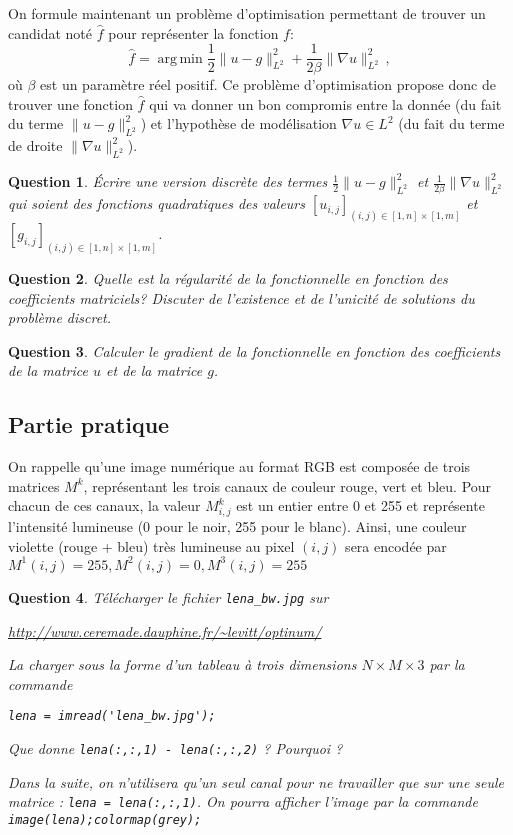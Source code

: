 \documentclass[10pt,a4paper,fleqn]{report}
\DeclareMathOperator*{\argmin}{arg\,min}
\newtheorem{question}{Question}
\begin{document}
 On formule maintenant un probl\`eme d'optimisation permettant de trouver un candidat not\'e $\hat{f}$ pour repr\'esenter la fonction $f$:
\begin{equation}
\hat{f} = \argmin \frac12 \| u -  g\|_{L^2}^2 + \frac{1}{2\beta}\| \nabla u \|^2_{L^2}\,,
\end{equation}
o\`u $\beta$ est un param\`etre r\'eel positif.
Ce probl\`eme d'optimisation propose donc de trouver une fonction $\hat{f}$ qui va donner un bon compromis entre la donn\'ee (du fait du terme $ \| u -  g\|_{L^2}^2 $) et l'hypoth\`ese de mod\'elisation $\nabla u \in L^2$ (du fait du terme de droite $\| \nabla u \|^2_{L^2}$).

\begin{question}
\'Ecrire une version discr\`ete des termes $\frac12 \| u -  g\|_{L^2}^2$ et $\frac{1}{2\beta}\| \nabla u \|^2_{L^2}$ qui soient des fonctions quadratiques des valeurs $[u_{i,j}]_{(i,j)\in [1,n]\times[1,m]}$ et $[g_{i,j}]_{(i,j)\in [1,n]\times[1,m]}$.
\end{question}

\begin{question}
Quelle est la r\'egularit\'e de la fonctionnelle en fonction des coefficients matriciels?
Discuter de l'existence et de l'unicit\'e de solutions du probl\`eme discret.
\end{question}

\begin{question}
Calculer le gradient de la fonctionnelle en fonction des coefficients de la matrice $u$ et de la matrice $g$.
\end{question}

\subsection{Partie pratique}

On rappelle qu'une image numérique au format RGB est composée de trois
matrices $M^{k}$, représentant les trois canaux de couleur rouge, vert
et bleu. Pour chacun de ces canaux, la valeur $M^{k}_{i,j}$ est un
entier entre 0 et 255 et représente l'intensité lumineuse (0 pour le
noir, 255 pour le blanc). Ainsi, une couleur violette (rouge + bleu)
très lumineuse au pixel $(i,j)$ sera encodée par $M^{1}(i,j) = 255,
M^{2}(i,j) = 0, M^{3}(i,j) = 255$

\begin{question}
  Télécharger le fichier \verb+lena_bw.jpg+ sur

  \url{http://www.ceremade.dauphine.fr/~levitt/optinum/}

  La charger sous la forme d'un tableau à trois dimensions $N \times M
  \times 3$ par la commande

  \verb+lena = imread('lena_bw.jpg');+

  Que donne \verb+lena(:,:,1) - lena(:,:,2)+ ? Pourquoi ?

  Dans la suite, on n'utilisera qu'un seul canal pour ne travailler
  que sur une seule matrice : \verb+lena = lena(:,:,1)+. On pourra
  afficher l'image par la commande \verb+image(lena);colormap(grey);+
\end{question}
\end{document}
